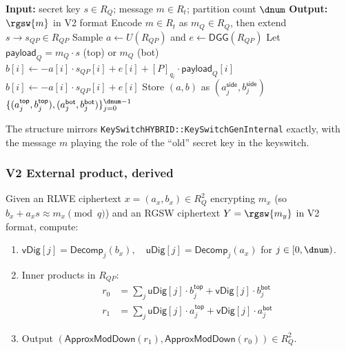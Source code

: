 \begin{algorithm}[ht!]
\caption{V2 \gls{rgsw} encryption (server-side, mirrors hybrid keyswitch)}
\label{alg:rgsw-v2}
\begin{algorithmic}[1]
    \State \textbf{Input:} secret key $s \in R_Q$; message $m \in R_t$; partition count $\dnum$
    \State \textbf{Output:} $\rgsw{m}$ in V2 format
    \State Encode $m \in R_t$ as $m_Q \in R_Q$, then extend $s \to s_{QP} \in R_{QP}$
            \State Sample $a \leftarrow U(R_{QP})$ and $e \leftarrow \mathsf{DGG}(R_{QP})$
            \State Let $\mathsf{payload}_Q = m_Q \cdot s$ (top) or $m_Q$ (bot)
            \For{tower $i \in [0, \mathsf{sizeQ} + \mathsf{sizeP})$}
                    \State $b[i] \gets -a[i] \cdot s_{QP}[i] + e[i] + [P]_{q_i} \cdot \mathsf{payload}_Q[i]$
                \Else
                    \State $b[i] \gets -a[i] \cdot s_{QP}[i] + e[i]$
                \EndIf
            \EndFor
            \State Store $(a, b)$ as $(a_j^{\mathsf{side}}, b_j^{\mathsf{side}})$
        \EndFor
    \EndFor
    \State \Return $\{(a_j^{\mathsf{top}}, b_j^{\mathsf{top}}), (a_j^{\mathsf{bot}}, b_j^{\mathsf{bot}})\}_{j=0}^{\dnum - 1}$
\end{algorithmic}
\end{algorithm}

The structure mirrors \texttt{KeySwitchHYBRID::KeySwitchGenInternal} exactly, with the message $m$ playing the role of the ``old'' secret key in the keyswitch.

\subsubsection{V2 External product, derived}
\label{sec:rgsw:v2-extprod}

Given an RLWE ciphertext $x = (a_x, b_x) \in R_Q^2$ encrypting $m_x$ (so $b_x + a_x s \approx m_x \pmod{q}$) and an RGSW ciphertext $Y = \rgsw{m_y}$ in V2 format, compute:

\begin{enumerate}
    \item $\mathsf{vDig}[j] = \mathsf{Decomp}_j(b_x), \quad \mathsf{uDig}[j] = \mathsf{Decomp}_j(a_x)$ for $j \in [0, \dnum)$.
    \item Inner products in $R_{QP}$:
    \begin{align}
        r_0 &= \sum_j \mathsf{uDig}[j] \cdot b_j^{\mathsf{top}} + \mathsf{vDig}[j] \cdot b_j^{\mathsf{bot}} \\
        r_1 &= \sum_j \mathsf{uDig}[j] \cdot a_j^{\mathsf{top}} + \mathsf{vDig}[j] \cdot a_j^{\mathsf{bot}}
    \end{align}
    \item Output $(\mathsf{ApproxModDown}(r_1), \mathsf{ApproxModDown}(r_0)) \in R_Q^2$.
\end{enumerate}


